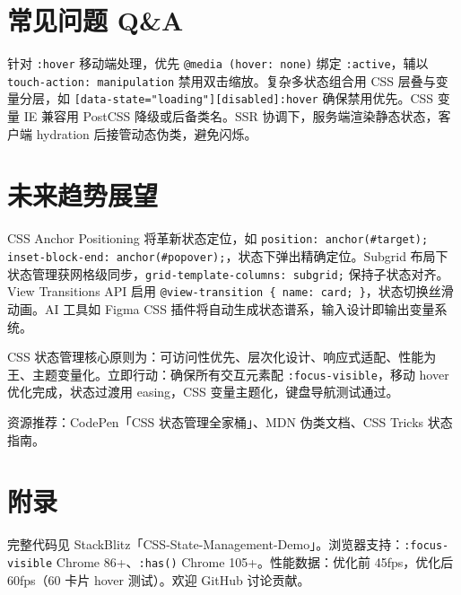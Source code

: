 \chapter{常见问题 Q\&{}A}
针对 \texttt{:hover} 移动端处理，优先 \texttt{@media (hover: none)} 绑定 \texttt{:active}，辅以 \texttt{touch-action: manipulation} 禁用双击缩放。复杂多状态组合用 CSS 层叠与变量分层，如 \texttt{[data-state="loading"][disabled]:hover} 确保禁用优先。CSS 变量 IE 兼容用 PostCSS 降级或后备类名。SSR 协调下，服务端渲染静态状态，客户端 hydration 后接管动态伪类，避免闪烁。\par
\chapter{未来趋势展望}
CSS Anchor Positioning 将革新状态定位，如 \texttt{position: anchor(\#{}target); inset-block-end: anchor(\#{}popover);}，状态下弹出精确定位。Subgrid 布局下状态管理获网格级同步，\texttt{grid-template-columns: subgrid;} 保持子状态对齐。View Transitions API 启用 \texttt{@view-transition \{{} name: card; \}{}}，状态切换丝滑动画。AI 工具如 Figma CSS 插件将自动生成状态谱系，输入设计即输出变量系统。\par
CSS 状态管理核心原则为：可访问性优先、层次化设计、响应式适配、性能为王、主题变量化。立即行动：确保所有交互元素配 \texttt{:focus-visible}，移动 hover 优化完成，状态过渡用 easing，CSS 变量主题化，键盘导航测试通过。\par
资源推荐：CodePen「CSS 状态管理全家桶」、MDN 伪类文档、CSS Tricks 状态指南。\par
\chapter{附录}
完整代码见 StackBlitz「CSS-State-Management-Demo」。浏览器支持：\texttt{:focus-visible} Chrome 86+、\texttt{:has()} Chrome 105+。性能数据：优化前 45fps，优化后 60fps（60 卡片 hover 测试）。欢迎 GitHub 讨论贡献。\par
